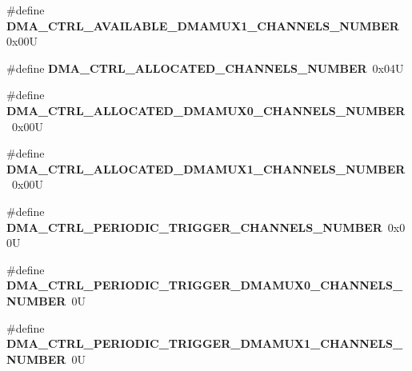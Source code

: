 \begin{DoxyCompactItemize}
\item 
\hypertarget{group___d_m_a___c_t_r_l__module_gacc278e448d9ad7da776fa177871087dc}{\#define {\bfseries D\-M\-A\-\_\-\-C\-T\-R\-L\-\_\-\-A\-V\-A\-I\-L\-A\-B\-L\-E\-\_\-\-D\-M\-A\-M\-U\-X1\-\_\-\-C\-H\-A\-N\-N\-E\-L\-S\-\_\-\-N\-U\-M\-B\-E\-R}~0x00\-U}\label{group___d_m_a___c_t_r_l__module_gacc278e448d9ad7da776fa177871087dc}

\item 
\hypertarget{group___d_m_a___c_t_r_l__module_gaea0a03e47be15d20944d4525089d329b}{\#define {\bfseries D\-M\-A\-\_\-\-C\-T\-R\-L\-\_\-\-A\-L\-L\-O\-C\-A\-T\-E\-D\-\_\-\-C\-H\-A\-N\-N\-E\-L\-S\-\_\-\-N\-U\-M\-B\-E\-R}~0x04\-U}\label{group___d_m_a___c_t_r_l__module_gaea0a03e47be15d20944d4525089d329b}

\item 
\hypertarget{group___d_m_a___c_t_r_l__module_ga80e23f3b1dfb3c3886a80c70dd56c78a}{\#define {\bfseries D\-M\-A\-\_\-\-C\-T\-R\-L\-\_\-\-A\-L\-L\-O\-C\-A\-T\-E\-D\-\_\-\-D\-M\-A\-M\-U\-X0\-\_\-\-C\-H\-A\-N\-N\-E\-L\-S\-\_\-\-N\-U\-M\-B\-E\-R}~0x00\-U}\label{group___d_m_a___c_t_r_l__module_ga80e23f3b1dfb3c3886a80c70dd56c78a}

\item 
\hypertarget{group___d_m_a___c_t_r_l__module_ga82f0ab14a79a3ff93372728778a88cac}{\#define {\bfseries D\-M\-A\-\_\-\-C\-T\-R\-L\-\_\-\-A\-L\-L\-O\-C\-A\-T\-E\-D\-\_\-\-D\-M\-A\-M\-U\-X1\-\_\-\-C\-H\-A\-N\-N\-E\-L\-S\-\_\-\-N\-U\-M\-B\-E\-R}~0x00\-U}\label{group___d_m_a___c_t_r_l__module_ga82f0ab14a79a3ff93372728778a88cac}

\item 
\hypertarget{group___d_m_a___c_t_r_l__module_ga5dc538a95136c46dfc82ddad09f82378}{\#define {\bfseries D\-M\-A\-\_\-\-C\-T\-R\-L\-\_\-\-P\-E\-R\-I\-O\-D\-I\-C\-\_\-\-T\-R\-I\-G\-G\-E\-R\-\_\-\-C\-H\-A\-N\-N\-E\-L\-S\-\_\-\-N\-U\-M\-B\-E\-R}~0x00\-U}\label{group___d_m_a___c_t_r_l__module_ga5dc538a95136c46dfc82ddad09f82378}

\item 
\hypertarget{group___d_m_a___c_t_r_l__module_ga3b34c900ed3d3e30b8efc569051b8119}{\#define {\bfseries D\-M\-A\-\_\-\-C\-T\-R\-L\-\_\-\-P\-E\-R\-I\-O\-D\-I\-C\-\_\-\-T\-R\-I\-G\-G\-E\-R\-\_\-\-D\-M\-A\-M\-U\-X0\-\_\-\-C\-H\-A\-N\-N\-E\-L\-S\-\_\-\-N\-U\-M\-B\-E\-R}~0\-U}\label{group___d_m_a___c_t_r_l__module_ga3b34c900ed3d3e30b8efc569051b8119}

\item 
\hypertarget{group___d_m_a___c_t_r_l__module_gade12bb2afe8dd891d5f6de83c0bd6f45}{\#define {\bfseries D\-M\-A\-\_\-\-C\-T\-R\-L\-\_\-\-P\-E\-R\-I\-O\-D\-I\-C\-\_\-\-T\-R\-I\-G\-G\-E\-R\-\_\-\-D\-M\-A\-M\-U\-X1\-\_\-\-C\-H\-A\-N\-N\-E\-L\-S\-\_\-\-N\-U\-M\-B\-E\-R}~0\-U}\label{group___d_m_a___c_t_r_l__module_gade12bb2afe8dd891d5f6de83c0bd6f45}


\end{DoxyCompactItemize}
